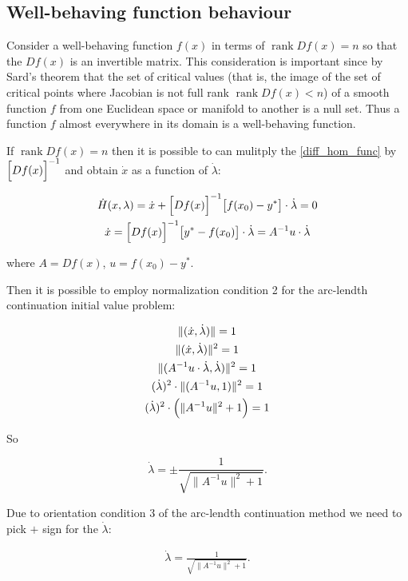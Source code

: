 \documentclass[11pt,american]{article}
\DeclareMathOperator{\rank}{\operatorname{rank}}
\begin{document}
\subsection{Well-behaving function behaviour}

Consider a well-behaving function $f(x)$ in terms of $\rank D f(x) = n$ so that the $D f(x)$ is an invertible matrix. This consideration is important since by Sard's theorem that the set of critical values (that is, the image of the set of critical points where Jacobian is not full rank $\rank D f(x) < n$) of a smooth function $f$ from one Euclidean space or manifold to another is a null set. Thus a function $f$ almost everywhere in its domain is a well-behaving function.

If $\rank D f(x) = n$ then it is possible to can mulitply the \eqref{diff_hom_func} by $\Bigl[ D f(x) \Bigr]^{-1}$ and obtain $\dot x$ as a function of $\dot \lambda$:

\begin{gather}
\dot H(x,\lambda) = \dot x + \Bigl[ D f(x) \Bigr]^{-1} \bigl[ f(x_0) - y^* \bigr] \cdot \dot \lambda = 0\\
\dot x = \Bigl[ D f(x) \Bigr]^{-1} \bigl[ y^* - f(x_0) \bigr] \cdot \dot \lambda = A^{-1} u \cdot \dot \lambda
\end{gather}

where $A = D f(x)$, $u = f(x_0) - y^*$.

Then it is possible to employ normalization condition 2 for the arc-lendth continuation initial value problem: 

\begin{gather}
\|(\dot x,\dot \lambda)\| = 1 \\
\|(\dot x,\dot \lambda)\|^2 = 1 \\
\| ( A^{-1} u \cdot \dot \lambda , \dot \lambda ) \|^2 = 1 \\
(\dot \lambda)^2 \cdot \| (A^{-1} u , 1) \|^2 = 1 \\
(\dot \lambda)^2 \cdot \Bigl( \| A^{-1} u \|^2 + 1 \Bigr ) = 1
\end{gather}

So

\begin{equation}
\dot \lambda = \pm \frac{1}{\sqrt{\|A^{-1}u\|^2 + 1}}.
\end{equation}

Due to orientation condition 3 of the arc-lendth continuation method we need to pick $+$ sign for the $\dot \lambda$:

\begin{gather}
\dot \lambda = \frac{1}{\sqrt{\|A^{-1}u\|^2 + 1}}.
\end{gather}
\end{document}
